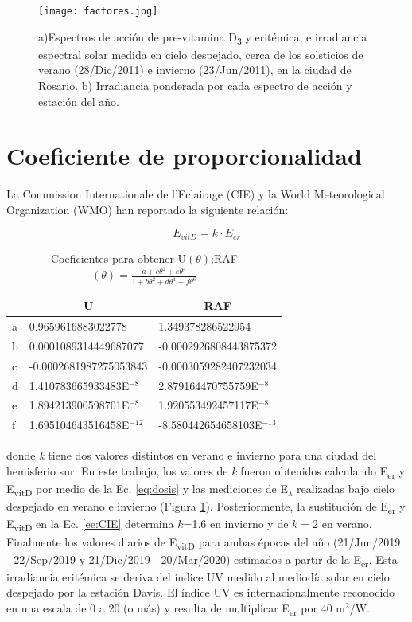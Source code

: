 \documentclass[10pt,twocolumn]{article}
\begin{document}
\begin{figure}[ht]
  \centering
  \texttt{[image: factores.jpg]}
  \caption{a)Espectros de acción de pre-vitamina D\textsubscript{3} y eritémica, e irradiancia espectral solar medida en cielo despejado, cerca de los solsticios de verano (28/Dic/2011) e invierno (23/Jun/2011), en la ciudad de Rosario. b) Irradiancia ponderada por cada espectro de acción y estación del año.}
  \label{fig:factores}
\end{figure}

\section{Coeficiente de proporcionalidad}
La Commission Internationale de l’Eclairage (CIE) y la World Meteorological Organization (WMO) han reportado la siguiente relación:

\begin{equation}
  E_{vitD} = k \cdot E_{er}
  \label{ee:CIE}
\end{equation}
\begin{table}[ht]
  \centering
  \caption{Coeficientes\cite{Herman2010} para obtener U$(\theta)$;RAF $(\theta)= \frac{a+c\theta^2+e\theta^4}{1+b\theta^2+d\theta^4+f\theta^6}$}
  \label{table::parametros}
  \begin{tabular}{lll}
    \hline
      & \multicolumn{1}{c}{U}      & \multicolumn{1}{c}{RAF}     \\ \hline
    a & 0.9659616883022778         & 1.349378286522954           \\
    b & 0.0001089314449687077      & -0.0002926808443875372      \\
    c & -0.0002681987275053843     & -0.0003059282407232034      \\
    d & 1.410783665933483E$^{-8 }$ & 2.879164470755759E$^{-8}$   \\
    e & 1.894213900598701E$^{-8 }$ & 1.920553492457117E$^{-8}$   \\
    f & 1.695104643516458E$^{-12}$ & -8.580442654658103E$^{-13}$ \\ \hline
  \end{tabular}
\end{table}

donde \emph{k} tiene dos valores distintos en verano e invierno para una ciudad del hemisferio sur.\cite{UVDoses} En este trabajo, los valores de \emph{k} fueron obtenidos calculando E\textsubscript{er} y E\textsubscript{vitD} por medio de la Ec. \ref{eq:dosis} y las mediciones de E$_\lambda$ realizadas bajo cielo despejado en verano e invierno (Figura \ref{fig:factores}). Posteriormente, la sustitución de E\textsubscript{er} y E\textsubscript{vitD} en la Ec. \ref{ee:CIE} determina $k$=1.6 en invierno y de $k=2$ en verano. Finalmente los valores diarios de E\textsubscript{vitD} para ambas épocas del año (21/Jun/2019 - 22/Sep/2019 y 21/Dic/2019 - 20/Mar/2020) estimados a partir de la E\textsubscript{er}. Esta irradiancia eritémica se deriva del índice UV medido al mediodía solar en cielo despejado por la estación Davis. El índice UV es internacionalmente reconocido en una escala de 0 a 20 (o más) y resulta de multiplicar E\textsubscript{er} por 40 m$^2$/W.
\end{document}
